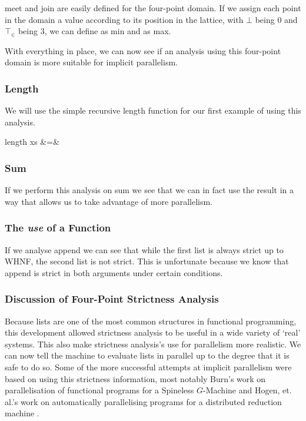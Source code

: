 \<meet\> and \<join\> are easily defined for the four-point domain. If we
assign each point in the domain a value according to its position in the lattice,
with $\bot$ being $0$ and $\top_{\in}$ being $3$, we can define \meet as \<min\>
and \join as \<max\>.

With everything in place, we can now see if an analysis using this four-point
domain is more suitable for implicit parallelism.

\subsubsection{Length}

We will use the simple recursive \<length\> function for our first example of
using this analysis.

\begin{haskell*}
length xs &=& 
\end{haskell*}

\subsubsection{Sum}

If we perform this analysis on \<sum\> we see that we can in fact use the
result in a way that allows us to take advantage of more parallelism.

\subsubsection{The \emph{use} of a Function}

If we analyse \<append\> we can see that while the first list is always
strict up to WHNF, the second list is not strict. This is unfortunate because
we know that \<append\> is strict in both arguments under certain conditions.

\subsubsection{Discussion of Four-Point Strictness Analysis}

Because lists are one of the most common structures in functional programming,
this development allowed strictness analysis to be useful in a wide variety of
`real' systems. This also make strictness analysis's use for parallelism more
realistic. We can now tell the machine to evaluate lists in parallel up to the
degree that it is safe to do so. Some of the more successful attempts at
implicit parallelism were based on using this strictness information, most
notably Burn's work on parallelisation of functional programs for a Spineless
$G$-Machine  and Hogen, et. al.'s work on automatically
parallelising programs for a distributed reduction machine
\citep{hogen1992automatic}.


